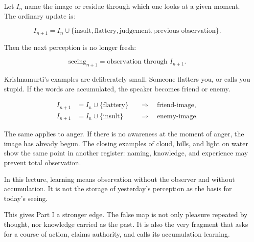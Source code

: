 \documentclass[11pt,oneside]{book}
\begin{document}
Let $I_n$ name the image or residue through which one looks at a given moment. The ordinary update is:

\begin{equation}
I_{n+1}
=
I_n \cup
\{\text{insult},\text{flattery},\text{judgement},\text{previous observation}\}.
\end{equation}

Then the next perception is no longer fresh:

\begin{equation}
\text{seeing}_{n+1}
=
\text{observation through } I_{n+1}.
\end{equation}

Krishnamurti's examples are deliberately small. Someone flatters you, or calls you stupid. If the words are accumulated, the speaker becomes friend or enemy.

\begin{align}
I_{n+1}
&= I_n \cup \{\text{flattery}\}
&&\Longrightarrow\quad \text{friend-image},\\
I_{n+1}
&= I_n \cup \{\text{insult}\}
&&\Longrightarrow\quad \text{enemy-image}.
\end{align}

The same applies to anger. If there is no awareness at the moment of anger, the image has already begun. The closing examples of cloud, hills, and light on water show the same point in another register: naming, knowledge, and experience may prevent total observation.

\begin{definition}
In this lecture, learning means observation without the observer and without accumulation. It is not the storage of yesterday's perception as the basis for today's seeing.
\end{definition}

This gives Part I a stronger edge. The false map is not only pleasure repeated by thought, nor knowledge carried as the past. It is also the very fragment that asks for a course of action, claims authority, and calls its accumulation learning.

\end{document}
